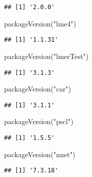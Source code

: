 \documentclass[
]{book}
\newenvironment{Shaded}{\begin{snugshade}}{\end{snugshade}}
\newcommand{\FunctionTok}[1]{\textcolor[rgb]{0.00,0.00,0.00}{#1}}
\newcommand{\NormalTok}[1]{#1}
\newcommand{\StringTok}[1]{\textcolor[rgb]{0.31,0.60,0.02}{#1}}
\begin{document}
\begin{verbatim}
## [1] '2.0.0'
\end{verbatim}

\begin{Shaded}
\begin{Highlighting}[]
\FunctionTok{packageVersion}\NormalTok{(}\StringTok{"lme4"}\NormalTok{)}
\end{Highlighting}
\end{Shaded}

\begin{verbatim}
## [1] '1.1.31'
\end{verbatim}

\begin{Shaded}
\begin{Highlighting}[]
\FunctionTok{packageVersion}\NormalTok{(}\StringTok{"lmerTest"}\NormalTok{)}
\end{Highlighting}
\end{Shaded}

\begin{verbatim}
## [1] '3.1.3'
\end{verbatim}

\begin{Shaded}
\begin{Highlighting}[]
\FunctionTok{packageVersion}\NormalTok{(}\StringTok{"car"}\NormalTok{)}
\end{Highlighting}
\end{Shaded}

\begin{verbatim}
## [1] '3.1.1'
\end{verbatim}

\begin{Shaded}
\begin{Highlighting}[]
\FunctionTok{packageVersion}\NormalTok{(}\StringTok{"pscl"}\NormalTok{)}
\end{Highlighting}
\end{Shaded}

\begin{verbatim}
## [1] '1.5.5'
\end{verbatim}

\begin{Shaded}
\begin{Highlighting}[]
\FunctionTok{packageVersion}\NormalTok{(}\StringTok{"nnet"}\NormalTok{)}
\end{Highlighting}
\end{Shaded}

\begin{verbatim}
## [1] '7.3.18'
\end{verbatim}
\end{document}
